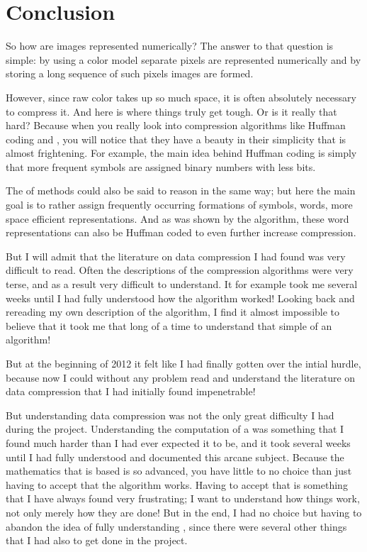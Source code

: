 \begin{comment}
  
\end{comment}

\chapter{Conclusion}
\label{cha:conclus}

So how are images represented numerically? The answer to that question
is simple: by using a color model separate pixels are represented
numerically and by storing a long sequence of such pixels images are
formed.

However, since raw color takes up so much space, it is often
absolutely necessary to compress it. And here is where things truly
get tough. Or is it really that hard? Because when you really look
into compression algorithms like Huffman coding and \lzw, you will
notice that they have a beauty in their simplicity that is almost
frightening. For example, the main idea behind Huffman coding is
simply that more frequent symbols are assigned binary numbers with
less bits.

The \lzfam of methods could also be said to reason in the same way;
but here the main goal is to rather assign frequently occurring
formations of symbols, words, more space efficient
representations. And as was shown by the  algorithm, these
word representations can also be Huffman coded to even further
increase compression.

But I will admit that the literature on data compression I had found
was very difficult to read. Often the descriptions of the compression
algorithms were very terse, and as a result very difficult to
understand. It for example took me several weeks until I had fully
understood how the \lzw algorithm worked! Looking back and rereading
my own description of the algorithm, I find it almost impossible to
believe that it took me that long of a time to understand that simple
of an algorithm!

But at the beginning of 2012 it felt like I had finally gotten over
the intial hurdle, because now I could without any problem read and
understand the literature on data compression that I had initially
found impenetrable!

But understanding data compression was not the only great difficulty I
had during the project. Understanding the computation of a \crc was
something that I found much harder than I had ever expected it to be,
and it took several weeks until I had fully understood and documented
this arcane subject. Because the mathematics that \crc is based is so
advanced, you have little to no choice than just having to accept that
the algorithm works. Having to accept that is something that I have
always found very frustrating; I want to understand how things work,
not only merely how they are done! But in the end, I had no choice but
having to abandon the idea of fully understanding \crc, since there
were several other things that I had also to get done in the project.

